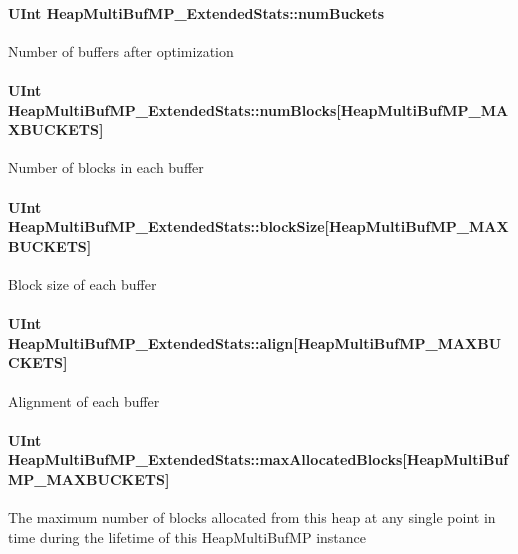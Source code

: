 \paragraph[{numBuckets}]{\setlength{\rightskip}{0pt plus 5cm}UInt {\bf HeapMultiBufMP\_\-ExtendedStats::numBuckets}}\hfill\label{struct_heap_multi_buf_m_p___extended_stats_a67a4abac5bfe360b37989a60d4a4cfb4}
Number of buffers after optimization 
\paragraph[{numBlocks}]{\setlength{\rightskip}{0pt plus 5cm}UInt {\bf HeapMultiBufMP\_\-ExtendedStats::numBlocks}\mbox{[}HeapMultiBufMP\_\-MAXBUCKETS\mbox{]}}\hfill\label{struct_heap_multi_buf_m_p___extended_stats_a084ca66b6b093779c105a1846eae6bd4}
Number of blocks in each buffer 
\paragraph[{blockSize}]{\setlength{\rightskip}{0pt plus 5cm}UInt {\bf HeapMultiBufMP\_\-ExtendedStats::blockSize}\mbox{[}HeapMultiBufMP\_\-MAXBUCKETS\mbox{]}}\hfill\label{struct_heap_multi_buf_m_p___extended_stats_a2477f91b9b48ec54b5f14f5c808e1678}
Block size of each buffer 
\paragraph[{align}]{\setlength{\rightskip}{0pt plus 5cm}UInt {\bf HeapMultiBufMP\_\-ExtendedStats::align}\mbox{[}HeapMultiBufMP\_\-MAXBUCKETS\mbox{]}}\hfill\label{struct_heap_multi_buf_m_p___extended_stats_a6ba215fe07dc8a00e8eb8cf75cf1d81c}
Alignment of each buffer 
\paragraph[{maxAllocatedBlocks}]{\setlength{\rightskip}{0pt plus 5cm}UInt {\bf HeapMultiBufMP\_\-ExtendedStats::maxAllocatedBlocks}\mbox{[}HeapMultiBufMP\_\-MAXBUCKETS\mbox{]}}\hfill\label{struct_heap_multi_buf_m_p___extended_stats_af3ef9e5df01faaffdead0223f75b9884}
The maximum number of blocks allocated from this heap at any single point in time during the lifetime of this HeapMultiBufMP instance 
